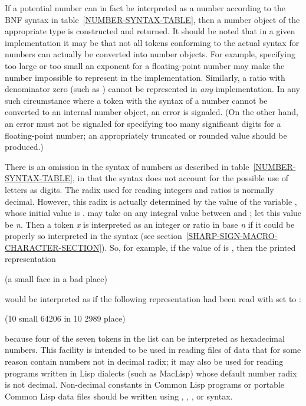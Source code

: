 If a potential number can in fact
be interpreted as a number according to the BNF
syntax in table~\ref{NUMBER-SYNTAX-TABLE}, then a number object of the
appropriate type is constructed and returned.  It should be noted that in
a given implementation it may be that not all tokens conforming to the
actual syntax for numbers can actually be converted into number objects.
For example, specifying too large or too small an exponent for a floating-point
number may make the number impossible to represent in the implementation.
Similarly, a ratio with denominator zero (such as )
cannot be represented in {\it any} implementation.
In any such circumstance where
a token with the syntax of a number cannot be converted to an internal
number object, an error is signaled.  (On the other hand, an error
must not be signaled for specifying too many significant digits
for a floating-point number; an appropriately truncated or rounded
value should be produced.)

There is an omission in the syntax of numbers
as described in table~\ref{NUMBER-SYNTAX-TABLE},
in that the syntax does not account for the possible
use of letters as digits.
The radix used for reading integers and ratios is normally decimal.
However, this radix is actually determined by the value of
the variable , whose initial value is .
 may take on any integral value between  and ;
let this value be {\it n}.  Then a token {\it x} is interpreted as
an integer or ratio in base {\it n} if it could be properly
so interpreted in the syntax 
(see section~\ref{SHARP-SIGN-MACRO-CHARACTER-SECTION}).
So, for example, if the value of  is ,
then the printed representation
\begin{lisp}
(a small face in a bad place)
\end{lisp}
would be interpreted as if the following representation had
been read with  set to :
\begin{lisp}
(10 small 64206 in 10 2989 place)
\end{lisp}
because four of the seven tokens in the list can be interpreted
as hexadecimal numbers.  This facility is intended to be used
in reading files of data that for some reason contain numbers
not in decimal radix; it may also be used for reading programs
written in Lisp dialects (such as MacLisp) whose default number radix is not
decimal.  Non-decimal constants in Common Lisp programs
or portable Common Lisp data files should be written using
, , , or  syntax.

